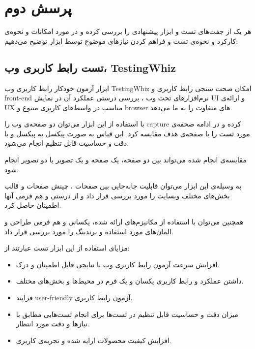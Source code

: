 
\section{پرسش دوم}
هر یک از جفت‌های تست و ابزار پیشنهادی را بررسی کرده و در مورد امکانات و نحوه‌ی کارکرد و نحوه‌ی تست و فراهم کردن نیاز‌های موضوع توسط ابزار توضیح می‌دهیم:

\subsection{تست رابط کاربری وب، TestingWhiz}
ابزار آزمون خودکار رابط کاربری وب TestingWhiz امکان  صحت سنجی رابط کاربری و front-end نرم‌افزار‌های تحت وب ، بررسی درستی عملکرد آن در نمایش UI و ارائه‌ی UX مناسب در واسط‌های کاربری متنوع و browser های متفاوت را به ما می‌دهد.

با استفاده از این ابزار می‌توان دو صفحه‌ی وب را capture کرده و در ادامه صحفه‌ی مورد تست را با صفحه‌ی هدف مقایسه کرد. این قیاس به صورت پیکسل به پیکسل و با دقت و حساسیت قابل تنظیم انجام می‌شود.

مقایسه‌ی انجام شده می‌تواند بین دو صفحه، یک صفحه و یک تصویر یا دو تصویر انجام شود.


به وسیله‌ی این ابزار می‌توان قابلیت جابه‌جایی بین صفحات
، چینش صفحات
و قالب
بخش‌های مختلف وبسایت را مورد بررسی قرار داد و از درستی و هم فرمی آنها اطمینان حاصل کرد.

همچنین می‌توان با استفاده از مکانیزم‌های ارائه شده، یکسانی و هم فرمی 
طراحی و 
المان‌های مورد استفاده و برندینگ را مورد بررسی قرار داد.


مزایای استفاده از این ابزار تست عبارتند از:
\begin{itemize}
\item
افزایش سرعت آزمون رابط کاربری وب با نتایجی قابل اطمینان و درک.
\item
داشتن عملکرد و رابط کاربری یکسان و یک فرم در محیط‌ها و بخش‌های مختلف.
\item
فرایند user-friendly آزمون رابط کاربری.
\item
میزان دقت و حساسیت قابل تنظیم در تست‌ها برای انجام تست‌هایی مطابق با نیاز‌ها و دقت مورد انتظار.
\item
افزایش کیفیت محصولات ارايه شده و تجربه‌ی کاربری.
\end{itemize}

